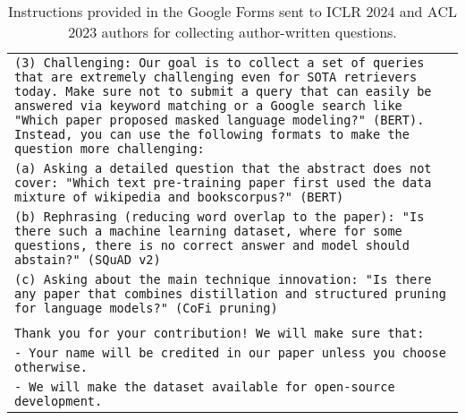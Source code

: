 \begin{table*}[h]
\begin{tabular}{>{\raggedright\arraybackslash\tt}p{}<{}}
(3) Challenging: Our goal is to collect a set of queries that are extremely challenging even for SOTA retrievers today. Make sure not to submit a query that can easily be answered via keyword matching or a Google search like "Which paper proposed masked language modeling?" (BERT). Instead, you can use the following formats to make the question more challenging: \\
    (a) Asking a detailed question that the abstract does not cover: "Which text pre-training paper first used the data mixture of wikipedia and bookscorpus?" (BERT) \\
    (b) Rephrasing (reducing word overlap to the paper): "Is there such a machine learning dataset, where for some questions, there is no correct answer and model should abstain?" (SQuAD v2) \\
    (c) Asking about the main technique innovation: "Is there any paper that combines distillation and structured pruning for language models?" (CoFi pruning) \\ \\

Thank you for your contribution! We will make sure that: \\
    - Your name will be credited in our paper unless you choose otherwise. \\
    - We will make the dataset available for open-source development. \\

\bottomrule
    \end{tabular}
    \caption{
        Instructions provided in the Google Forms  sent to ICLR 2024 and ACL 2023 authors for collecting author-written questions.
    }
    \label{tab:author_form}
\end{table*}

